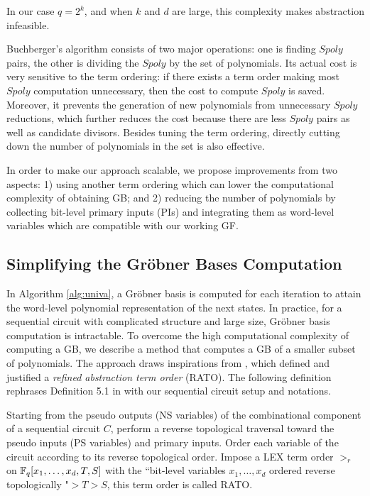 In our case $q = 2^k$, and when $k$ and $d$ are large, this complexity 
makes abstraction infeasible.

Buchberger's algorithm consists of two major operations: one is finding 
$Spoly$ pairs, the other is dividing the $Spoly$ by the set of polynomials.
Its actual cost is very sensitive to the term ordering: if there exists 
a term order making most $Spoly$ computation unnecessary, then the cost to 
compute $Spoly$ is saved. Moreover, it prevents the generation of new polynomials 
from unnecessary $Spoly$ reductions, which further reduces the cost
because there are less $Spoly$ pairs as well as candidate divisors.
Besides tuning the term ordering, directly cutting down the number of 
polynomials in the set is also effective.

In order to make our approach scalable, we propose improvements from 
two aspects: 1) using another term ordering which can lower the 
computational complexity of obtaining GB; and 2) reducing the number of
polynomials by collecting bit-level primary inputs (PIs) and integrating them as word-level 
variables which are compatible with our working GF.

\subsection{Simplifying the Gr\"obner Bases Computation}
In Algorithm \ref{alg:univa}, a Gr\"obner basis is computed for each
iteration to attain the word-level polynomial representation of the next states. In practice, for 
a sequential circuit with complicated structure and large size, Gr\"obner basis computation
is intractable. To overcome the high computational complexity of computing a GB, 
we describe a method that computes a GB of a smaller subset of polynomials.
The approach draws inspirations from \cite{pruss:tcad15}, which defined and justified a 
{\it refined abstraction term order} (RATO). The following definition rephrases Definition 5.1 in \cite{pruss:tcad15}
with our sequential circuit setup and notations.

\begin{Definition}
Starting from the pseudo outputs (NS variables) of the combinational component of a sequential circuit $C$, 
perform a reverse topological 
traversal toward the pseudo inputs (PS variables) and primary inputs. Order each variable of the circuit according to
its reverse topological order. Impose a LEX term order $>_r$ on ${\mathbb{F}}_{q}[x_1,\dots,x_d,T,S]$
with the ``bit-level variables $x_1,\dots,x_d$ ordered reverse topologically "$ > T>S$,
this term order is called RATO.
\end{Definition}



